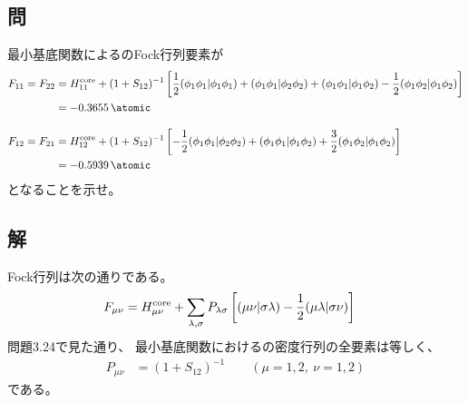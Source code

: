 \subsection{問}
最小基底関数によるのFock行列要素が
\begin{align}
	F_{11}
=
	F_{22}
&=
	H^{\rm core}_{11}
	+
	(1+S_{12})^{-1}
	\left[
		\frac{1}{2}
		\spacetwo{\phi_1\phi_1}{\phi_1\phi_1}
		+
		\spacetwo{\phi_1\phi_1}{\phi_2\phi_2}
		+
		\spacetwo{\phi_1\phi_1}{\phi_1\phi_2}
		-
		\frac{1}{2}
		\spacetwo{\phi_1\phi_2}{\phi_1\phi_2}
	\right] \\
&=
	\SI{-0.3655}{\atomic} \\[3mm]
%
%
	F_{12}
=
	F_{21}
&=
	H^{\rm core}_{12}
	+
	(1+S_{12})^{-1}
	\left[
		-
		\frac{1}{2}
		\spacetwo{\phi_1\phi_1}{\phi_2\phi_2}
		+
		\spacetwo{\phi_1\phi_1}{\phi_1\phi_2}
		+
		\frac{3}{2}
		\spacetwo{\phi_1\phi_2}{\phi_1\phi_2}
	\right] \\
%
%
&=
	\SI{-0.5939}{\atomic}
\end{align}
となることを示せ。

\subsection{解}
Fock行列は次の通りである。
\begin{align}
	F_{\mu\nu}
&=
	H^{\rm core}_{\mu\nu}
	+
	\sum_{\lambda,\sigma}
		P_{\lambda\sigma}
		\left[
			{(\mu\nu|\sigma\lambda)}
			-
			\frac{1}{2}
			{(\mu\lambda|\sigma\nu)}
		\right]
\end{align}
問題3.24で見た通り、
最小基底関数におけるの密度行列の全要素は等しく、
\begin{align}
	P_{\mu\nu}
&=
	(1+S_{12})^{-1}
	\qquad
	(\mu = 1,2,\ \nu = 1,2)
\end{align}
である。

